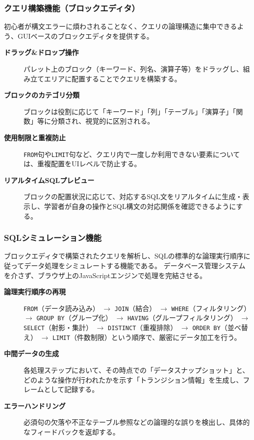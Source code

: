 \documentclass[uplatex,a4paper,12pt]{ujreport}
\begin{document}
\subsubsection{クエリ構築機能（ブロックエディタ）}
初心者が構文エラーに煩わされることなく、クエリの論理構造に集中できるよう、GUIベースのブロックエディタを提供する。
\begin{description}
  \item[\textbf{ドラッグ\&ドロップ操作}] パレット上のブロック（キーワード、列名、演算子等）をドラッグし、組み立てエリアに配置することでクエリを構築する。
  \item[\textbf{ブロックのカテゴリ分類}] ブロックは役割に応じて「キーワード」「列」「テーブル」「演算子」「関数」等に分類され、視覚的に区別される。
  \item[\textbf{使用制限と重複防止}] \texttt{FROM}句や\texttt{LIMIT}句など、クエリ内で一度しか利用できない要素については、重複配置をUIレベルで防止する。
  \item[\textbf{リアルタイムSQLプレビュー}] ブロックの配置状況に応じて、対応するSQL文をリアルタイムに生成・表示し、学習者が自身の操作とSQL構文の対応関係を確認できるようにする。
\end{description}

\subsubsection*{SQLシミュレーション機能}
ブロックエディタで構築されたクエリを解析し、SQLの標準的な論理実行順序に従ってデータ処理をシミュレートする機能である。
データベース管理システムを介さず、ブラウザ上のJavaScriptエンジンで処理を完結させる。
\begin{description}
  \item[\textbf{論理実行順序の再現}] \texttt{FROM}（データ読み込み） $\rightarrow$ \texttt{JOIN}（結合） $\rightarrow$ \texttt{WHERE}（フィルタリング） $\rightarrow$ \texttt{GROUP BY}（グループ化） $\rightarrow$ \texttt{HAVING}（グループフィルタリング） $\rightarrow$ \texttt{SELECT}（射影・集計） $\rightarrow$ \texttt{DISTINCT}（重複排除） $\rightarrow$ \texttt{ORDER BY}（並べ替え） $\rightarrow$ \texttt{LIMIT}（件数制限）という順序で、厳密にデータ加工を行う。
  \item[\textbf{中間データの生成}] 各処理ステップにおいて、その時点での「データスナップショット」と、どのような操作が行われたかを示す「トランジション情報」を生成し、フレームとして記録する。
  \item[\textbf{エラーハンドリング}] 必須句の欠落や不正なテーブル参照などの論理的な誤りを検出し、具体的なフィードバックを返却する。
\end{description}
\end{document}
